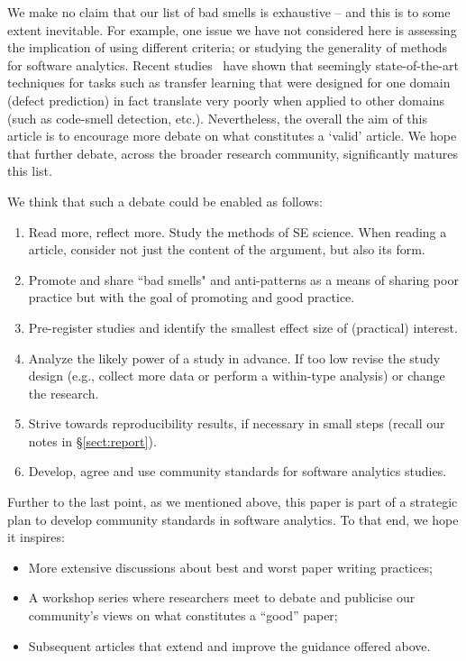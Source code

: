 \documentclass[preprint,10pt]{elsarticle}
\newcommand{\bi}{\begin{itemize}}
\newcommand{\ei}{\end{itemize}}
\begin{document}
We make no claim that our  list of bad smells is exhaustive --  and this is to some extent inevitable. For example, one issue we have not considered here is assessing the implication of using different criteria; or studying the generality of methods for software analytics.  Recent studies~\cite{krishna18a} have shown that seemingly state-of-the-art techniques for tasks such as transfer learning that were designed for one domain (defect prediction) in fact translate very poorly when applied to other domains (such as code-smell detection, etc.).
Nevertheless, the overall the aim of this article is to encourage more debate on what constitutes a `valid' article. We hope that further debate, across the broader research community, significantly matures this list.

We think that such a debate could be enabled as follows:
\begin{enumerate}
    \item Read more, reflect more. Study the methods of SE science.%
    When reading a article, consider not just the content of the argument, but also its form.
    \item Promote and share ``bad smells" and anti-patterns as a means of sharing poor practice but with the goal of promoting and good practice.
    \item Pre-register studies and identify the smallest effect size of (practical) interest.
    \item Analyze the likely power of a study in advance. If too low  revise the study design (e.g., collect more data or perform a within-type analysis) or change the research.
    \item Strive towards 
    reproducibility
    results,  if necessary in small steps (recall our notes    in \S\ref{sect:report}).
     \item Develop, agree and use community standards  for software analytics studies.
     \end{enumerate}
Further to the last point, as we mentioned above, this paper is part of a strategic plan to develop community standards in software analytics.  To that end, we hope it inspires:
     \bi
     \item More  extensive discussions about best and worst paper writing practices; 
\item A workshop series where researchers meet to debate and publicise our community's views on what constitutes a ``good''  paper;
\item Subsequent articles
that extend and improve the guidance offered above.
\ei
  
\end{document}
